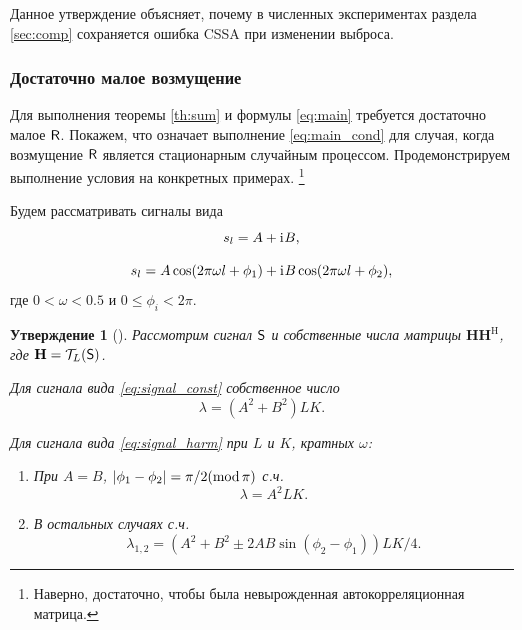 \documentclass[specialist,
               substylefile = spbu.rtx,
               subf,href,colorlinks=true, 12pt]{disser}
\newtheorem{statement}{Утверждение}
\begin{document}
Данное утверждение объясняет, почему в численных экспериментах раздела \ref{sec:comp} сохраняется ошибка CSSA при изменении выброса.

\subsubsection{Достаточно малое возмущение}

Для выполнения теоремы \ref{th:sum} и формулы \eqref{eq:main} требуется достаточно малое $\textsf{R}$.
Покажем, что означает выполнение \eqref{eq:main_cond} для случая, когда возмущение $\textsf{R}$ является стационарным случайным процессом. Продемонстрируем выполнение условия на конкретных примерах.
\footnote{Наверно, достаточно, чтобы была невырожденная автокорреляционная матрица.}

Будем рассматривать сигналы вида
\begin{equation} \label{eq:signal_const}
	s_l = A + \mathrm{i}\mkern1mu B,
\end{equation}

\begin{equation} \label{eq:signal_harm}
	s_l = A\cos(2 \pi\omega l + \phi_1) + \mathrm{i}\mkern1mu B\cos(2 \pi\omega l + \phi_2),
\end{equation}
где $0<\omega < 0.5$ и $0\le\phi_i < 2\pi$.

\begin{statement} [\cite{Golyandina.Stepanov2005}]\label{st:singular_values}
	Рассмотрим сигнал $\textsf{S}$ и собственные числа матрицы $\mathbf{H}\mathbf{H}^\mathrm{H}$, где $\mathbf{H} = \mathcal{T}_L(\textsf{S})$.
	
	Для сигнала вида \eqref{eq:signal_const} собственное число $$\lambda = (A^2 + B^2) L K.$$
	
	Для сигнала вида \eqref{eq:signal_harm} при $L$ и $K$, кратных $\omega$:
	\begin{enumerate}
		\item При $A = B$, $|\phi_1 - \phi_2| = \pi / 2(\mathop{\mathrm{mod}} \pi)$ с.ч. $$\lambda = A^2 L K.$$
		\item В остальных случаях с.ч. $$\lambda_{1,2} = (A^2 + B^2 \pm 2 A B \sin(\phi_2 - \phi_1)) L K / 4.$$
	\end{enumerate}
\end{statement}
\end{document}
